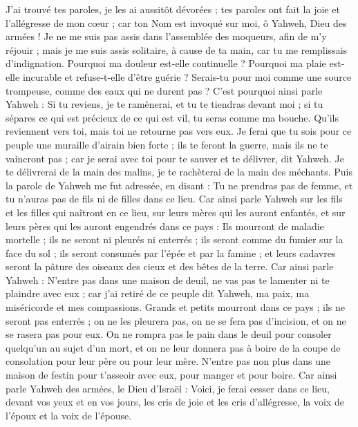 \begin{multicols}{2}
J’ai trouvé tes paroles, je les ai aussitôt dévorées ; tes paroles ont fait la joie et l’allégresse de mon cœur ; car ton Nom est invoqué sur moi, ô Yahweh, Dieu des armées !
Je ne me suis pas assis dans l’assemblée des moqueurs, afin de m’y réjouir ; mais je me suis assis solitaire, à cause de ta main, car tu me remplissais d’indignation.
Pourquoi ma douleur est-elle continuelle ? Pourquoi ma plaie est-elle incurable et refuse-t-elle d'être guérie ? Serais-tu pour moi comme une source trompeuse, comme des eaux qui ne durent pas ?
C'est pourquoi ainsi parle Yahweh : Si tu reviens, je te ramènerai, et tu te tiendras devant moi ; si tu sépares ce qui est précieux de ce qui est vil, tu seras comme ma bouche. Qu'ils reviennent vers toi, mais toi ne retourne pas vers eux.
Je ferai que tu sois pour ce peuple une muraille d'airain bien forte ; ils te feront la guerre, mais ils ne te vaincront pas ; car je serai avec toi pour te sauver et te délivrer, dit Yahweh.
Je te délivrerai de la main des malins, je te rachèterai de la main des méchants.
\VerseOne{}Puis la parole de Yahweh me fut adressée, en disant :
Tu ne prendras pas de femme, et tu n'auras pas de fils ni de filles dans ce lieu.
Car ainsi parle Yahweh sur les fils et les filles qui naîtront en ce lieu, sur leurs mères qui les auront enfantés, et sur leurs pères qui les auront engendrés dans ce pays :
Ils mourront de maladie mortelle ; ils ne seront ni pleurés ni enterrés ; ils seront comme du fumier sur la face du sol ; ils seront consumés par l'épée et par la famine ; et leurs cadavres seront la pâture des oiseaux des cieux et des bêtes de la terre.
Car ainsi parle Yahweh : N'entre pas dans une maison de deuil, ne vas pas te lamenter ni te plaindre avec eux ; car j'ai retiré de ce peuple dit Yahweh, ma paix, ma miséricorde et mes compassions.
Grands et petits mourront dans ce pays ; ils ne seront pas enterrés ; on ne les pleurera pas, on ne se fera pas d’incision, et on ne se rasera pas pour eux.
On ne rompra pas le pain dans le deuil pour consoler quelqu'un au sujet d'un mort, et on ne leur donnera pas à boire de la coupe de consolation pour leur père ou pour leur mère.
N'entre pas non plus dans une maison de festin pour t'asseoir avec eux, pour manger et pour boire.
Car ainsi parle Yahweh des armées, le Dieu d'Israël : Voici, je ferai cesser dans ce lieu, devant vos yeux et en vos jours, les cris de joie et les cris d'allégresse, la voix de l'époux et la voix de l'épouse.

\end{multicols}
